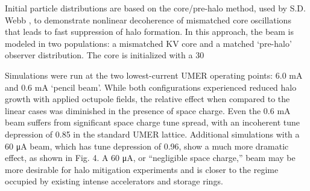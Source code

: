 \begin{figure}[]
\centering
{}\label{fig:halo-snap-60muA}
\label{fig:halo-snap-pencil}
\caption{}
\label{fig:halo-snap}
\end{figure}

Initial particle distributions are based on the core/pre-halo method, used by S.D. Webb \cite{Webb2013},\cite{WebbIPAC2013} to demonstrate nonlinear decoherence of mismatched core oscillations that leads to fast suppression of halo formation. In this approach, the beam is modeled in two populations: a mismatched KV core and a matched ‘pre-halo’ observer distribution. The core is initialized with a 30%

Simulations were run at the two lowest-current UMER operating points: 6.0 mA and 0.6 mA ‘pencil beam’. While both configurations experienced reduced halo growth with applied octupole fields, the relative effect when compared to the linear cases was diminished in the presence of space charge. Even the 0.6 mA beam suffers from significant space charge tune spread, with an incoherent tune depression of 0.85 in the standard UMER lattice. Additional simulations with a 60 μA beam, which has tune depression of 0.96, show a much more dramatic effect, as shown in Fig. 4. A 60 μA, or “negligible space charge,” beam may be more desirable for halo mitigation experiments and is closer to the regime occupied by existing intense accelerators and storage rings. 




